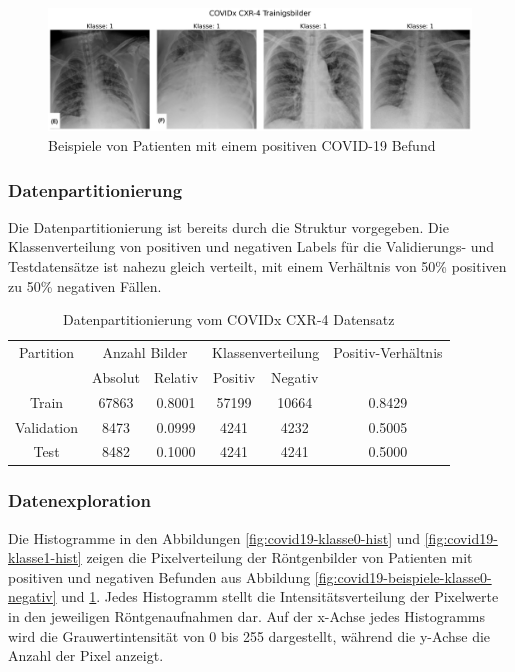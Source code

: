 \begin{figure}[H]
    \centering
    \includegraphics[width=\linewidth]{01-images/03-data/covid19-klasse1.png}
    \caption{Beispiele von Patienten mit einem positiven COVID-19 Befund}
    \label{fig:covid19-beispiele-klasse1-positiv}
\end{figure}

\subsubsection{Datenpartitionierung} \label{chap:COVID19-Partition}
Die Datenpartitionierung ist bereits durch die Struktur vorgegeben. Die Klassenverteilung von positiven und negativen Labels für die Validierungs- und Testdatensätze ist nahezu gleich verteilt, mit einem Verhältnis von 50\% positiven zu 50\% negativen Fällen.

\begin{table}[h]
    \centering
    \begin{tabular}{@{}cccccc@{}}
        \toprule
        Partition & \multicolumn{2}{c}{Anzahl Bilder} & \multicolumn{2}{c}{Klassenverteilung} & Positiv-Verhältnis\\ 
        \cmidrule(lr){2-3} \cmidrule(lr){4-5} 
                  & Absolut & Relativ & Positiv & Negativ & \\ 
        \midrule
        Train      & 67863 & 0.8001 & 57199 & 10664 & 0.8429 \\
        Validation & 8473  & 0.0999 & 4241  & 4232  & 0.5005 \\
        Test       & 8482  & 0.1000 & 4241  & 4241  & 0.5000 \\ 
        \bottomrule
    \end{tabular}
    \caption{Datenpartitionierung vom COVIDx CXR-4 Datensatz}
    \label{tab:covid19-klassenverteilung}
\end{table}

\subsubsection{Datenexploration} \label{chap:COVID19-eda}
Die Histogramme in den Abbildungen \ref{fig:covid19-klasse0-hist} und \ref{fig:covid19-klasse1-hist} zeigen die Pixelverteilung der Röntgenbilder von Patienten mit positiven und negativen Befunden aus Abbildung \ref{fig:covid19-beispiele-klasse0-negativ} und \ref{fig:covid19-beispiele-klasse1-positiv}. Jedes Histogramm stellt die Intensitätsverteilung der Pixelwerte in den jeweiligen Röntgenaufnahmen dar. Auf der x-Achse jedes Histogramms wird die Grauwertintensität von 0 bis 255 dargestellt, während die y-Achse die Anzahl der Pixel anzeigt.

